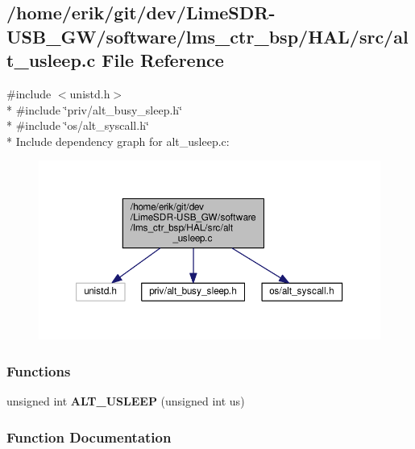 \subsection{/home/erik/git/dev/\+Lime\+S\+D\+R-\/\+U\+S\+B\+\_\+\+G\+W/software/lms\+\_\+ctr\+\_\+bsp/\+H\+A\+L/src/alt\+\_\+usleep.c File Reference}
\label{alt__usleep_8c}
{\ttfamily \#include $<$unistd.\+h$>$}\\*
{\ttfamily \#include \char`\"{}priv/alt\+\_\+busy\+\_\+sleep.\+h\char`\"{}}\\*
{\ttfamily \#include \char`\"{}os/alt\+\_\+syscall.\+h\char`\"{}}\\*
Include dependency graph for alt\+\_\+usleep.\+c\+:
\nopagebreak
\begin{figure}[H]
\begin{center}
\leavevmode
\includegraphics[width=350pt]{dc/df1/alt__usleep_8c__incl}
\end{center}
\end{figure}
\subsubsection*{Functions}
\begin{DoxyCompactItemize}
\item 
unsigned int {\bf A\+L\+T\+\_\+\+U\+S\+L\+E\+EP} (unsigned int us)
\end{DoxyCompactItemize}


\subsubsection{Function Documentation}
